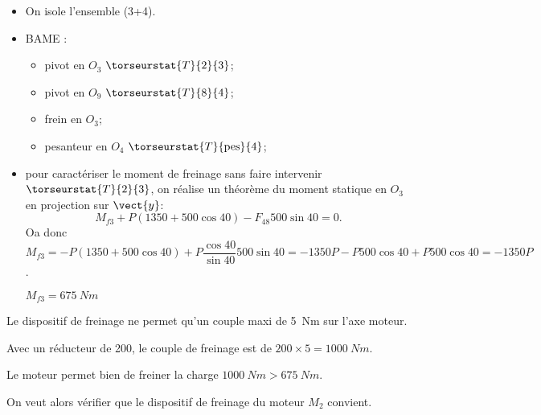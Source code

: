 \ifprof
\begin{corrige}
\begin{itemize}
\item On isole l'ensemble (3+4).
\item BAME : 
\begin{itemize}
\item pivot en $O_{3}$ $\torseurstat{T}{2}{3}$;
\item pivot en $O_{9}$ $\torseurstat{T}{8}{4}$;
\item frein en $O_{3}$;
\item pesanteur en $O_{4}$ $\torseurstat{T}{\text{pes}}{4}$;
\end{itemize}
\item pour caractériser le moment de freinage sans faire intervenir $\torseurstat{T}{2}{3}$, on réalise un théorème du moment statique en $O_3$ en projection sur $\vect{y}$: 
$$
M_{f3} + P(1350+500\cos 40) -F_{48}500\sin 40 = 0. 
$$
Oa donc 
$M_{f3} =- P(1350+500\cos 40) +P\dfrac{\cos 40}{ \sin 40}500\sin 40  
= - 1350P- P 500\cos 40 +P 500 \cos 40
= - 1350P$.

$M_{f3} = \SI{675}{Nm}$

\end{itemize}
\end{corrige}
\else
\fi

Le dispositif de freinage ne permet qu’un couple maxi de \SI{5}{Nm} sur l’axe 
moteur. 


\ifprof
\begin{corrige}
Avec un réducteur de 200, le couple de freinage est de $200\times 5 = \SI{1000}{Nm}$.
\end{corrige}
\else
\fi

\ifprof
\begin{corrige}
Le moteur permet bien de freiner la charge $\SI{1000}{Nm} > \SI{675}{Nm}$.

\end{corrige}
\else
\fi

On veut alors vérifier que le dispositif de freinage du moteur $M_2$ convient. 

